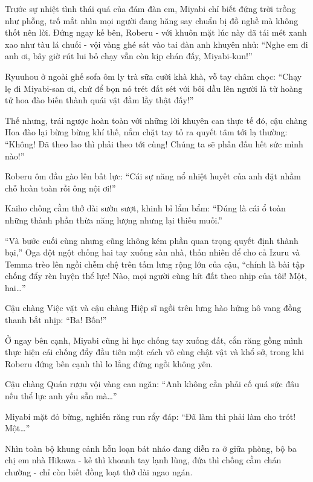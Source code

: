 \documentclass[../main.tex]{subfiles}
\begin{document}
Trước sự nhiệt tình thái quá của đám đàn em, Miyabi chỉ biết đứng trời trồng như phỗng, trố mắt nhìn mọi người đang hăng say chuẩn bị đồ nghề mà không thốt nên lời. Đứng ngay kế bên, Roberu - với khuôn mặt lúc này đã tái mét xanh xao như tàu lá chuối - vội vàng ghé sát vào tai đàn anh khuyên nhủ: ``Nghe em đi anh ơi, bây giờ rút lui bỏ chạy vẫn còn kịp chán đấy, Miyabi-kun!''


Ryuuhou ở ngoài ghế sofa ôm ly trà sữa cười khà khà, vỗ tay châm chọc: ``Chạy lẹ đi Miyabi-san ơi, chứ để bọn nó trét đất sét với bôi dầu lên người là từ hoàng tử hoa đào biến thành quái vật đầm lầy thật đấy!''

Thế nhưng, trái ngược hoàn toàn với những lời khuyên can thực tế đó, cậu chàng Hoa đào lại bừng bừng khí thế, nắm chặt tay tỏ ra quyết tâm tới lạ thường: ``Không! Đã theo lao thì phải theo tới cùng! Chúng ta sẽ phấn đấu hết sức mình nào!''

Roberu ôm đầu gào lên bất lực: ``Cái sự năng nổ nhiệt huyết của anh đặt nhầm chỗ hoàn toàn rồi ông nội ơi!''

Kaiho chống cằm thở dài sườn sượt, khinh bỉ lẩm bẩm: ``Đúng là cái ổ toàn những thành phần thừa năng lượng nhưng lại thiếu muối.''

``Và bước cuối cùng nhưng cũng không kém phần quan trọng quyết định thành bại,'' Oga đột ngột chống hai tay xuống sàn nhà, thản nhiên để cho cả Izuru và Temma trèo lên ngồi chễm chệ trên tấm lưng rộng lớn của cậu, ``chính là bài tập chống đẩy rèn luyện thể lực! Nào, mọi người cùng hít đất theo nhịp của tôi! Một, hai\dots''


Cậu chàng Việc vặt và cậu chàng Hiệp sĩ ngồi trên lưng hào hứng hô vang đồng thanh bắt nhịp: ``Ba! Bốn!''

Ở ngay bên cạnh, Miyabi cũng hì hục chống tay xuống đất, cắn răng gồng mình thực hiện cái chống đẩy đầu tiên một cách vô cùng chật vật và khổ sở, trong khi Roberu đứng bên cạnh thì lo lắng đứng ngồi không yên.

Cậu chàng Quán rượu vội vàng can ngăn: ``Anh không cần phải cố quá sức đâu nếu thể lực anh yếu sẵn mà\dots''

Miyabi mặt đỏ bừng, nghiến răng run rẩy đáp: ``Đã làm thì phải làm cho trót! Một\dots''

Nhìn toàn bộ khung cảnh hỗn loạn bát nháo đang diễn ra ở giữa phòng, bộ ba chị em nhà Hikawa - kẻ thì khoanh tay lạnh lùng, đứa thì chống cằm chán chường - chỉ còn biết đồng loạt thở dài ngao ngán.
\end{document}
